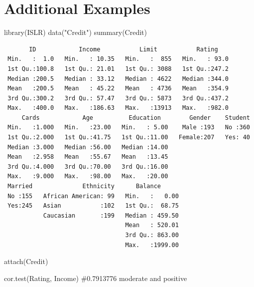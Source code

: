 \documentclass[
  letterpaper,
  DIV=11,
  numbers=noendperiod]{scrreprt}
\newenvironment{Shaded}{\begin{snugshade}}{\end{snugshade}}
\newcommand{\CommentTok}[1]{\textcolor[rgb]{0.37,0.37,0.37}{#1}}
\newcommand{\FunctionTok}[1]{\textcolor[rgb]{0.28,0.35,0.67}{#1}}
\newcommand{\NormalTok}[1]{\textcolor[rgb]{0.00,0.23,0.31}{#1}}
\newcommand{\StringTok}[1]{\textcolor[rgb]{0.13,0.47,0.30}{#1}}
\begin{document}
\section{Additional Examples}\label{additional-examples}

\begin{Shaded}
\begin{Highlighting}[]
\FunctionTok{library}\NormalTok{(ISLR)}
\FunctionTok{data}\NormalTok{(}\StringTok{"Credit"}\NormalTok{)}
\FunctionTok{summary}\NormalTok{(Credit)}
\end{Highlighting}
\end{Shaded}

\begin{verbatim}
       ID            Income           Limit           Rating     
 Min.   :  1.0   Min.   : 10.35   Min.   :  855   Min.   : 93.0  
 1st Qu.:100.8   1st Qu.: 21.01   1st Qu.: 3088   1st Qu.:247.2  
 Median :200.5   Median : 33.12   Median : 4622   Median :344.0  
 Mean   :200.5   Mean   : 45.22   Mean   : 4736   Mean   :354.9  
 3rd Qu.:300.2   3rd Qu.: 57.47   3rd Qu.: 5873   3rd Qu.:437.2  
 Max.   :400.0   Max.   :186.63   Max.   :13913   Max.   :982.0  
     Cards            Age          Education        Gender    Student  
 Min.   :1.000   Min.   :23.00   Min.   : 5.00    Male :193   No :360  
 1st Qu.:2.000   1st Qu.:41.75   1st Qu.:11.00   Female:207   Yes: 40  
 Median :3.000   Median :56.00   Median :14.00                         
 Mean   :2.958   Mean   :55.67   Mean   :13.45                         
 3rd Qu.:4.000   3rd Qu.:70.00   3rd Qu.:16.00                         
 Max.   :9.000   Max.   :98.00   Max.   :20.00                         
 Married              Ethnicity      Balance       
 No :155   African American: 99   Min.   :   0.00  
 Yes:245   Asian           :102   1st Qu.:  68.75  
           Caucasian       :199   Median : 459.50  
                                  Mean   : 520.01  
                                  3rd Qu.: 863.00  
                                  Max.   :1999.00  
\end{verbatim}

\begin{Shaded}
\begin{Highlighting}[]
\FunctionTok{attach}\NormalTok{(Credit)}

\FunctionTok{cor.test}\NormalTok{(Rating, Income)  }\CommentTok{\#0.7913776 moderate and positive}
\end{Highlighting}
\end{Shaded}
\end{document}
